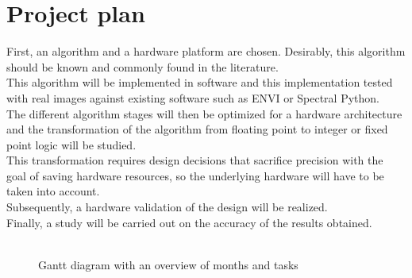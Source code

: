 \section{Project plan}
First, an algorithm and a hardware platform are chosen. Desirably, this algorithm should be known and commonly found in the literature.
\\
This algorithm will be implemented in software and this implementation tested with real images against existing software such as ENVI or Spectral Python.
\\
The different algorithm stages will then be optimized for a hardware architecture and the transformation of the algorithm from floating point to integer or fixed point logic will be studied.
\\
This transformation requires design decisions that sacrifice precision with the goal of saving hardware resources, so the underlying hardware will have to be taken into account.
\\
Subsequently, a hardware validation of the design will be realized.
\\
Finally, a study will be carried out on the accuracy of the results obtained.
\\
\\
    \begin{figure}[h!]
    \caption{Gantt diagram with an overview of months and tasks}
    \label{fig:gantt}
    \end{figure}
